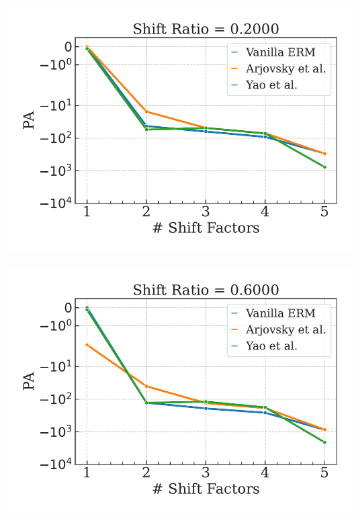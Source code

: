 \begin{figure}[H]
    \centering
    \begin{subfigure}[b]{0.32\textwidth}
        \centering
        \includegraphics[width=\textwidth]{img/results_discussion/datashift/paper_nonpaired_sel=acc_met=PA_sr=0.2.pdf}
    \end{subfigure}
    \hfill
    \begin{subfigure}[b]{0.32\textwidth}
        \centering
        \includegraphics[width=\textwidth]{img/results_discussion/datashift/paper_nonpaired_sel=acc_met=PA_sr=0.6.pdf}
    \end{subfigure}
    \hfill
    \begin{subfigure}[b]{0.32\textwidth}
        \centering

\end{subfigure}
\end{figure}
